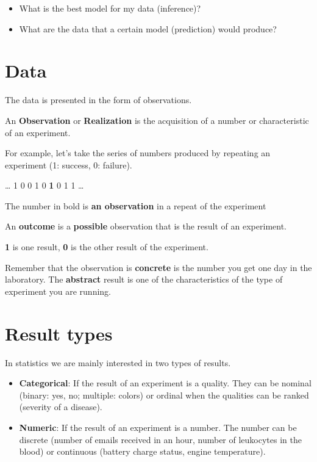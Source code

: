 \documentclass[
]{book}
\providecommand{\tightlist}{%
  \setlength{\itemsep}{0pt}\setlength{\parskip}{0pt}}
\begin{document}
\begin{itemize}
\tightlist
\item
  What is the best model for my data (inference)?
\item
  What are the data that a certain model (prediction) would produce?
\end{itemize}

\hypertarget{data}{%
\section{Data}\label{data}}

The data is presented in the form of observations.

An \textbf{Observation} or \textbf{Realization} is the acquisition of a number or characteristic of an experiment.

For example, let's take the series of numbers produced by repeating an experiment (1: success, 0: failure).

\ldots{} 1 0 0 1 0 \textbf{1} 0 1 1 \ldots{}

The number in bold is \textbf{an observation} in a repeat of the experiment

An \textbf{outcome} is a \textbf{possible} observation that is the result of an experiment.

\textbf{1} is one result, \textbf{0} is the other result of the experiment.

Remember that the observation is \textbf{concrete} is the number you get one day in the laboratory. The \textbf{abstract} result is one of the characteristics of the type of experiment you are running.

\hypertarget{result-types}{%
\section{Result types}\label{result-types}}

In statistics we are mainly interested in two types of results.

\begin{itemize}
\item
  \textbf{Categorical}: If the result of an experiment is a quality. They can be nominal (binary: yes, no; multiple: colors) or ordinal when the qualities can be ranked (severity of a disease).
\item
  \textbf{Numeric}: If the result of an experiment is a number. The number can be discrete (number of emails received in an hour, number of leukocytes in the blood) or continuous (battery charge status, engine temperature).
\end{itemize}
\end{document}
